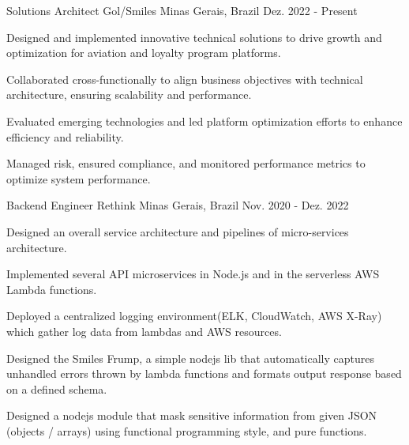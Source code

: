 

\begin{cventries}

  \cventry
    {Solutions Architect} %
    {Gol/Smiles} %
    {Minas Gerais, Brazil} %
    {Dez. 2022 - Present} %
    {
      \begin{cvitems} %
        \item Designed and implemented innovative technical solutions to drive growth and optimization for aviation and loyalty program platforms.
        \item Collaborated cross-functionally to align business objectives with technical architecture, ensuring scalability and performance.
        \item Evaluated emerging technologies and led platform optimization efforts to enhance efficiency and reliability.
        \item Managed risk, ensured compliance, and monitored performance metrics to optimize system performance.
      \end{cvitems}
    }

  \cventry
    {Backend Engineer} %
    {Rethink} %
    {Minas Gerais, Brazil} %
    {Nov. 2020 - Dez. 2022} %
    {
      \begin{cvitems} %
        \item {Designed an overall service architecture and pipelines of micro-services architecture.}
        \item {Implemented several API microservices in Node.js and in the serverless AWS Lambda functions.}
        \item {Deployed a centralized logging environment(ELK, CloudWatch, AWS X-Ray) which gather log data from lambdas and AWS resources.}
        \item {Designed the Smiles Frump, a simple nodejs lib that automatically captures unhandled errors thrown by lambda functions and formats output response based on a defined schema.}
        \item {Designed a nodejs module that mask sensitive information from given JSON (objects / arrays) using functional programming style, and pure functions.}
      \end{cvitems}
    }


\end{cventries}
